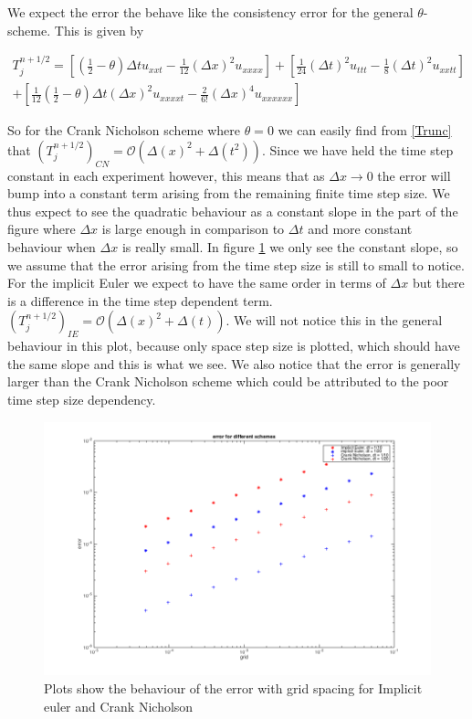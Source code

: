 \documentclass[ twoside,openright,titlepage,numbers=noenddot,headinclude,%
                footinclude=true,cleardoublepage=empty,abstractoff, %
                BCOR=5mm,paper=a4,fontsize=11pt,%
                ngerman,american,%
                ]{scrreprt}
\begin{document}
We expect the error the behave like the consistency error for the general $\theta$-scheme. This is given by

\begin{eqnarray}
T^{n+1/2}_j = \left[{  (\frac{1}{2} - \theta) \Delta t u_{xxt} - \frac{1}{12}(\Delta x)^2 u_{xxxx}  }\right] + \left[{ \frac{1}{24} (\Delta t)^2u_{ttt} - \frac{1}{8}(\Delta t)^2u_{xxtt} }\right]  \\ + \left[{  \frac{1}{12} (\frac{1}{2}-\theta)   \Delta t (\Delta x)^2 u_{xxxxt} - \frac{2}{6!}(\Delta x)^4u_{xxxxxx}  }\right]
\label{Trunc}
\end{eqnarray}


So for the Crank Nicholson scheme where $\theta = 0$ we can easily find from \ref{Trunc} that $(T_j^{n+1/2})_{CN} = \mathcal{O}(\Delta(x)^2 + \Delta(t^2))$. Since we have held the time step constant in each experiment however, this means that as $\Delta x \rightarrow 0$ the error will bump into a constant term arising from the remaining finite time step size. We thus expect to see the quadratic behaviour as a constant slope in the part of the figure where $\Delta x$ is large enough in comparison to $\Delta t$ and more constant behaviour when $\Delta x$ is really small. In figure \ref{errorDX} we only see the constant slope, so we assume that the error arising from the time step size is still to small to notice.
For the implicit Euler we expect to have the same order in terms of $\Delta x$ but there is a difference in the time step dependent term.  $(T_j^{n+1/2})_{IE} = \mathcal{O}(\Delta(x)^2 + \Delta(t))$. We will not notice this in the general behaviour in this plot, because only space step size is plotted, which should have the same slope and this is what we see. We also notice that the error is generally larger than the Crank Nicholson scheme which could be attributed to the poor time step size dependency. 
\begin{figure}
\includegraphics[scale = 0.45]{images/errorDX}
\caption{Plots show the behaviour of the error with grid spacing for Implicit euler and Crank Nicholson}
\label{errorDX}
\end{figure}
\end{document}
